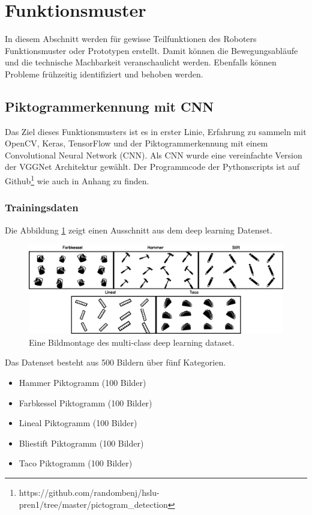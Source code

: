 \newpage
\section{Funktionsmuster}
In diesem Abschnitt werden für gewisse Teilfunktionen des Roboters Funktionsmuster oder Prototypen erstellt. Damit können die Bewegungsabläufe und die technische Machbarkeit veranschaulicht werden. Ebenfalls können Probleme frühzeitig identifiziert und behoben werden.
\subsection{Piktogrammerkennung mit CNN}
\label{sec:piktogrammerkennung-mit-cnn}
Das Ziel dieses Funktionsmusters ist es in erster Linie, Erfahrung zu sammeln mit OpenCV, Keras, TensorFlow und der Piktogrammerkennung mit einem Convolutional Neural Network (CNN). Als CNN wurde eine vereinfachte Version der VGGNet Architektur gewählt.
Der Programmcode der Pythonscripts ist auf Github\footnote{https://github.com/randombenj/hslu-pren1/tree/master/pictogram\_detection} wie auch in Anhang zu finden.

\subsubsection{Trainingsdaten}
Die Abbildung \ref{fig:deep-learning-dataset} zeigt einen Ausschnitt aus dem deep learning Datenset.

\begin{figure}[H]
  \includegraphics[width=1.0\textwidth]{img/piktogrammerkennung/collage.png}
  \centering
  \caption{Eine Bildmontage des multi-class deep learning dataset.}
  \label{fig:deep-learning-dataset}
\end{figure} 
   
Das Datenset besteht aus 500 Bildern über fünf Kategorien.
\begin{itemize}
    \item Hammer Piktogramm (100 Bilder)
    \item Farbkessel Piktogramm (100 Bilder)
    \item Lineal Piktogramm (100 Bilder)
    \item Bliestift Piktogramm (100 Bilder)
    \item Taco Piktogramm (100 Bilder)
 \end{itemize}
 
